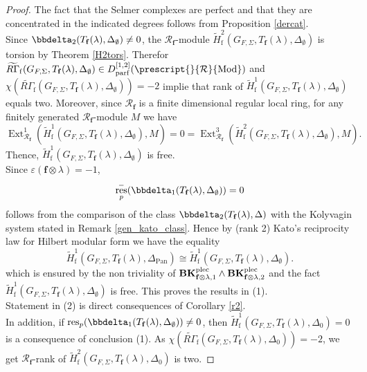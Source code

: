 \documentclass[10pt]{amsart}
\numberwithin{equation}{section}
\theoremstyle{definition}
\theoremstyle{remark} %
\newcommand{\Ext}{\operatorname{Ext}}
\newcommand{\pan}{\mathrm{Pan}}
\DeclareMathOperator{\res}{res}
\newcommand{\f}{\mathbf{f}}
\newcommand{\R}{\mathcal{R}}
\begin{document}
		\begin{proof}
			The fact that the Selmer complexes are perfect and that they are concentrated in the indicated degrees follows from Proposition \ref{dercat}. \\
			Since $\bbdelta_2(T_\f(\lambda), \Delta_\emptyset) \neq 0$, the $ \R_{\f} $-module $ \widetilde{H}^2_{\mathrm{f}}(G_{F,\Sigma},T_\f(\lambda),\Delta_\emptyset) $ is torsion by Theorem \ref{H2tors}. Therefor $ \widetilde{R\Gamma}_{\mathrm{f}}(G_{F,\Sigma},T_\f(\lambda), \Delta_\emptyset) \in D_{\mathrm{parf}}^{[1,2]}(\prescript{}{\R}{\mathrm{Mod}}) $ and $ \chi(\widetilde{R\Gamma}_{\mathrm{f}}(G_{F,\Sigma},T_\f(\lambda), \Delta_\emptyset))=-2 $ implie that rank of $ \widetilde{H}^1_{\mathrm{f}}(G_{F,\Sigma},T_\f(\lambda),\Delta_\emptyset) $ equals two. Moreover, since $ \R_{\f} $ is a finite dimensional regular local ring, for any finitely generated $ \R_{\f} $-module $ M $ we have $$ \Ext^1_{\R_{\f}}(\widetilde{H}^1_{\mathrm{f}}(G_{F,\Sigma},T_\f(\lambda),\Delta_\emptyset), M) = 0 = \Ext^3_{\R_{\f}}(\widetilde{H}^2_{\mathrm{f}}(G_{F,\Sigma},T_\f(\lambda),\Delta_\emptyset), M). $$ 
			Thence, $ \widetilde{H}^1_{\mathrm{f}}(G_{F,\Sigma},T_\f(\lambda),\Delta_\emptyset) $ is free. \\
			Since $ \varepsilon(\f \otimes \lambda) =-1 $, 
			\begin{equation}\label{res^-_p}
				\res^-_p(\bbdelta_1(T_\f(\lambda), \Delta_\emptyset)) = 0
			\end{equation} follows from the comparison of the class $ \bbdelta_2(T_\f(\lambda), \Delta) $ with the Kolyvagin system stated in Remark \ref{gen_kato_class}. Hence by (rank 2) Kato's reciprocity law for Hilbert modular form
			we have the equality $$ \widetilde{H}^1_{\mathrm{f}}(G_{F,\Sigma},T_\f(\lambda),\Delta_{\pan}) \cong \widetilde{H}^1_{\mathrm{f}}(G_{F,\Sigma},T_\f(\lambda),\Delta_\emptyset). $$
			which is ensured by the non triviality of $ \mathbf{BK}^{\rm plec}_{\f \otimes \lambda, 1} \wedge \mathbf{BK}^{\rm plec}_{\f \otimes \lambda, 2} $ and the fact $ \widetilde{H}^1_{\mathrm{f}}(G_{F,\Sigma},T_\f(\lambda),\Delta_\emptyset) $ is free. This proves the results in (1).		\\
			Statement in (2) is direct consequences of Corollary \ref{r2}. \\
			In addition, if $ \res_{p}(\bbdelta_1(T_\f(\lambda), \Delta_{\emptyset})) \ne 0 $, then $ \widetilde{H}^1_{\mathrm{f}}(G_{F,\Sigma},T_\f(\lambda),\Delta_{0}) = 0 $ is a consequence of conclusion (1). As $ \chi(\widetilde{R\Gamma}_{\mathrm{f}}(G_{F,\Sigma},T_\f(\lambda), \Delta_{0})) = -2  $, we get $ \R_{\f} $-rank of $ \widetilde{H}^2_{\mathrm{f}}(G_{F,\Sigma},T_\f(\lambda),\Delta_{0}) $ is two.
		\end{proof}
\end{document}
